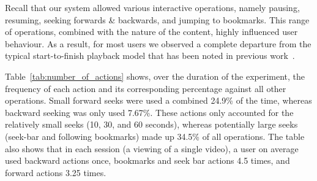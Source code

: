 \documentclass[a4paper,11pt]{article}
\newcommand{\capttext}{\protect\centering\em}
\begin{document}
\begin{table}[tb]
 \caption{\capttext Interactions observed throughout the experiment}
\label{tab:number_of_actions}
\end{table}

Recall that our system allowed various interactive operations, namely pausing, resuming, seeking forwards \& backwards, and jumping to bookmarks. This range of operations, combined with the nature of the content, highly influenced user behaviour. As a result, for most users we observed a complete departure from the typical start-to-finish playback model that has been noted in previous work~\cite{Costa04Analyzing}.

Table~\ref{tab:number_of_actions} shows, over the duration of the experiment, the frequency of each action and its corresponding percentage against all other operations. Small forward seeks were used a combined 24.9\% of the time, whereas backward seeking was only used 7.67\%. These actions only accounted for the relatively small seeks (10, 30, and 60 seconds), whereas potentially large seeks (seek-bar and following bookmarks) made up 34.5\% of all operations. The table also shows that in each session (a viewing of a single video), a user on average used backward actions once, bookmarks and seek bar actions 4.5 times, and forward actions 3.25 times.
\end{document}
